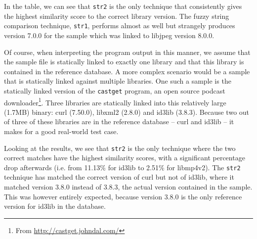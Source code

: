 \documentclass[twocolumn,a4paper]{IEEEtran} %
\begin{document}
In the table, we can see that \texttt{str2} is the only technique that consistently gives the highest similarity score to the correct library version. The fuzzy string comparison technique, \texttt{str1}, performs almost as well but strangely produces version 7.0.0 for the sample which was linked to libjpeg version 8.0.0. 

Of course, when interpreting the program output in this manner, we assume that the sample file is statically linked to exactly one library and that this library is contained in the reference database. A more complex scenario would be a sample that is statically linked against multiple libraries. One such a sample is the statically linked version of the \texttt{castget} program, an open source podcast downloader\footnote{From \url{http://castget.johndal.com/}}. Three libraries are statically linked into this relatively large (1.7MB) binary: curl (7.50.0), libxml2 (2.8.0) and id3lib (3.8.3). Because two out of three of these libraries are in the reference database -- curl and id3lib -- it makes for a good real-world test case.

Looking at the results, we see that \texttt{str2} is the only technique where the two correct matches have the highest similarity scores, with a significant percentage drop afterwards (i.e. from 11.13\% for id3lib to 2.51\% for libmp4v2). The \texttt{str2} technique has matched the correct version of curl but not of id3lib, where it matched version 3.8.0 instead of 3.8.3, the actual version contained in the sample. This was however entirely expected, because version 3.8.0 is the only reference version for id3lib in the database.
\end{document}
